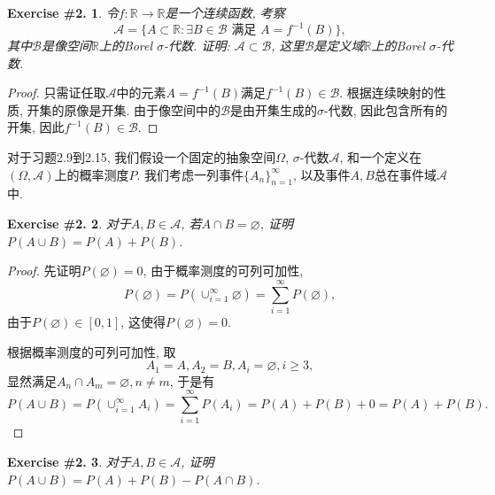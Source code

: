 \documentclass[UTF8, a4paper]{article}
\newtheorem{exercise}{Exercise \#2.}
\begin{document}
\begin{framed}
\begin{exercise}
令\(f: \mathbb{R} \to \mathbb{R}\)是一个连续函数, 考察
$$
\mathcal{A} = \{A\subset \mathbb{R}: \exists B \in \mathcal{B} \text{ 满足 } A = f^{-1}(B)\}, 
$$
其中\(\mathcal{B}\)是像空间\(\mathbb{R}\)上的Borel \(\sigma\)-代数. 证明: \(\mathcal{A} \subset \mathcal{B}\), 这里\(\mathcal{B}\)是定义域\(\mathbb{R}\)上的Borel \(\sigma\)-代数.
\end{exercise}
\end{framed}

\begin{proof}
只需证任取\(\mathcal{A}\)中的元素\(A = f^{-1}(B)\)满足\(f^{-1}(B) \in \mathcal{B}\).
根据连续映射的性质, 开集的原像是开集. 由于像空间中的\(\mathcal{B}\)是由开集生成的\(\sigma\)-代数, 因此包含所有的开集, 因此\(f^{-1}(B) \in \mathcal{B}\).
\end{proof}


对于习题2.9到2.15, 我们假设一个固定的抽象空间\(\Omega\), \(\sigma\)-代数\(\mathcal{A}\), 和一个定义在\((\Omega, \mathcal{A})\)上的概率测度\({P}\). 我们考虑一列事件\(\{A_n\}_{n=1}^\infty\), 以及事件\(A, B\)总在事件域\(\mathcal{A}\)中. 


\begin{framed}
\begin{exercise}
对于\(A,B \in \mathcal{A}\), 若\(A \cap B = \varnothing\), 证明\(P(A\cup B) = P(A) + P(B)\).
\end{exercise}
\end{framed}

\begin{proof}
先证明\(P(\varnothing) = 0\), 由于概率测度的可列可加性, 
$$
P(\varnothing) = P(\cup_{i=1}^\infty \varnothing) = \sum_{i=1}^\infty P(\varnothing) , 
$$
由于\(P(\varnothing) \in [0,1]\), 这使得\(P(\varnothing) = 0\).

根据概率测度的可列可加性, 取 
$$
A_1 = A, A_2 = B, A_i = \varnothing, i \geq 3,
$$
显然满足\(A_n \cap A_m = \varnothing, n\neq m\), 于是有
$$
P(A\cup B) = P\left(\cup_{i=1}^\infty A_i\right) = \sum_{i = 1}^{\infty} P(A_i) = P(A) + P(B) + 0 = P(A) + P(B).
$$
\end{proof}





\begin{framed}
\begin{exercise}
    对于\(A,B \in \mathcal{A}\), 证明\(P(A\cup B) = P(A) + P(B) - P(A\cap B)\).
\end{exercise}
\end{framed}
\end{document}
